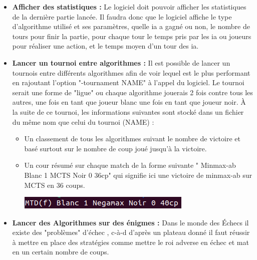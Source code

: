 \documentclass{article}
\begin{document}
\begin{itemize}
    \medskip
    \item \textbf{Afficher des statistiques :
    }
        \newline
        Le logiciel doit pouvoir afficher les statistiques de la dernière partie lancée. 
        \newline
        Il faudra donc que le logiciel affiche le type d'algorithme utilisé et ses paramètres, quelle ia a gagné ou non, le nombre de tours pour finir la partie, pour chaque tour le temps pris par les ia ou joueurs pour réaliser une action, et le temps moyen d'un tour des ia.
    \medskip
    \item \textbf{Lancer un tournoi entre algorithmes : }
    \newline
        Il est possible de lancer un tournois entre différents algorithmes afin de voir lequel est le plus performant en rajoutant l'option "-tournament NAME" à l'appel du logiciel.
        Le tournoi serait une forme de "ligue" ou chaque algorithme jouerais 2 fois contre tous les autres, une fois en tant que joueur blanc une fois en tant que joueur noir.
        \newline
        À la suite de ce tournoi, les informations suivantes sont stocké dans un fichier du même nom que celui du tournoi (NAME) :
        \begin{itemize}
            \item Un classement de tous les algorithmes suivant le nombre de victoire et basé surtout sur le nombre de coup joué jusqu'à la victoire.
            \item Un cour résumé sur chaque match de la forme suivante " Minmax-ab Blanc 1 MCTS Noir 0 36cp" qui signifie ici une victoire de minmax-ab sur MCTS en 36 coups.
            \newline
            \centerline{\includegraphics[scale = 0.5]{img/Summarytournament.png}}
        \end{itemize}
    \medskip
    \item \textbf{Lancer des Algorithmes sur des énigmes : }
    \newline
        Dans le monde des Échecs il existe des "problèmes" d'échec \cite{Krt}, c-à-d d'après un plateau donné il faut réussir à mettre en place des stratégies comme mettre le roi adverse en échec et mat en un certain nombre de coups.\newline
        \begin{itemize}

\end{itemize}
\end{itemize}
\end{document}

